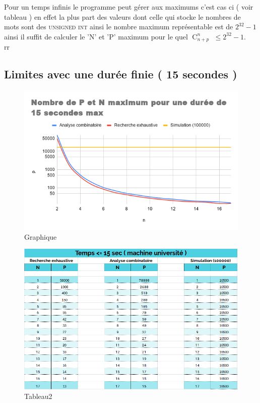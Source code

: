 \documentclass[a4paper, 11pt, oneside]{article}
\DeclareMathOperator{\comb}{C}
\begin{document}
Pour un temps infinis le programme peut gérer aux maximums c'est cas ci ( voir tableau ) en effet la plus part des valeurs dont celle qui stocke le nombres de mots sont des \textsc{unsigned int} ainsi le nombre maximum représentable est de $2^{32}-1$ ainsi il suffit de calculer le 'N' et 'P' maximum pour le quel $\comb_{n+p}^n$ $\leq 2^{32}-1$. \\ rr
\newpage

\subsection{Limites avec une durée finie ( 15 secondes )}

\begin{figure}[!h]
			\centering
\includegraphics[scale=0.5]{graphique2.png}
			\caption{Graphique}
		\end{figure}
		
\begin{figure}
\includegraphics[scale=0.5]{tableau2.png}
\caption{Tableau2}
\label{Tableau}
\end{figure}

 
\end{document}
